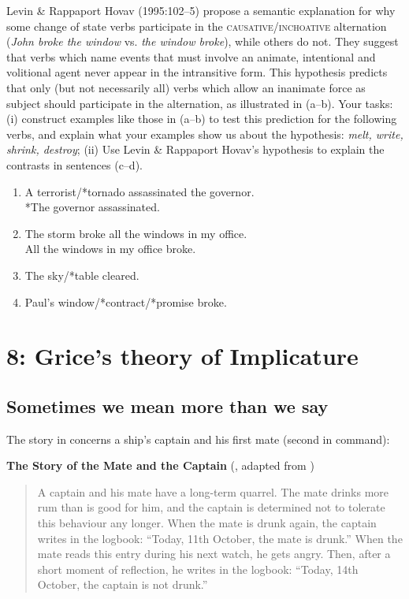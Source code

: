 Levin \& Rappaport Hovav (1995:102–5) propose a semantic explanation for why some change of state verbs participate in the \textsc{causative/inchoative} alternation (\textit{John broke the window} vs. \textit{the window broke}), while others do not. They suggest that verbs which name events that must involve an animate, intentional and volitional agent never appear in the intransitive form. This hypothesis predicts that only (but not necessarily all) verbs which allow an inanimate force as subject should participate in the alternation, as illustrated in (a--b). Your tasks: (i) construct examples like those in (a--b) to test this prediction for the following verbs, and explain what your examples show us about the hypothesis: \textit{melt, write, shrink, destroy}; (ii) Use Levin \& Rappaport Hovav’s hypothesis to explain the contrasts in sentences (c--d).

\begin{enumerate}[label=\alph*.]
\item A terrorist/*tornado assassinated the governor.\\
*The governor assassinated.
\item The storm broke all the windows in my office.\\
All the windows in my office broke.
\item The sky/*table cleared.
\item Paul’s window/*contract/*promise broke.
\end{enumerate}

\chapter{{8}: Grice’s theory of Implicature}

\section{Sometimes we mean more than we say}\label{sec:} %

The story in  concerns a ship’s captain and his first mate (second in command):

\ea \label{ex:8.1}
\textbf{The Story of the Mate and the Captain} (\citealt{Meibauer2005}, adapted from \citealt{Posner1980})\\
\begin{quote}
A captain and his mate have a long-term quarrel. The mate drinks more rum than is good for him, and the captain is determined not to tolerate this behaviour any longer. When the mate is drunk again, the captain writes in the logbook: “Today, 11th October, the mate is drunk.” When the mate reads this entry during his next watch, he gets angry. Then, after a short moment of reflection, he writes in the logbook: “Today, 14th October, the captain is not drunk.”
\end{quote}
\z


